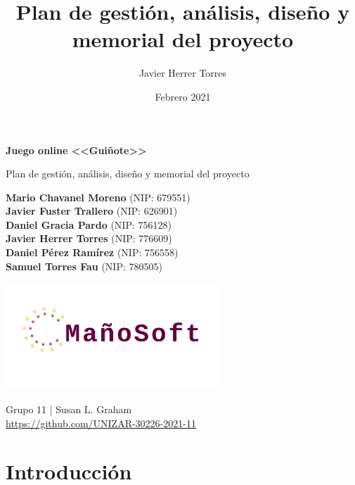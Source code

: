 \documentclass{article}
\title{Plan de gestión, análisis, diseño y memorial del proyecto}
\author{Javier Herrer Torres}
\date{Febrero 2021}
\begin{document}
\begin{titlepage}
    \begin{center}
        \vspace*{1cm}
            
        \Huge
        \textbf{Juego online <<Guiñote>>}
            
        \vspace{0.5cm}
        \LARGE
		Plan de gestión, análisis, diseño y memorial del proyecto
		
        \vspace{1.5cm}
            
        \textbf{Mario Chavanel Moreno} (NIP: 679551)\\
        \textbf{Javier Fuster Trallero} (NIP: 626901)\\
        \textbf{Daniel Gracia Pardo} (NIP: 756128)\\
        \textbf{Javier Herrer Torres} (NIP: 776609)\\
        \textbf{Daniel Pérez Ramírez} (NIP: 756558)\\
        \textbf{Samuel Torres Fau} (NIP: 780505)
        
        \vfill
            
    	\includegraphics[width=0.6\textwidth]{./images/logo.png}
            
        \vspace{1.5cm}
            
        
         Grupo 11 | Susan L. Graham\\
        \href{https://github.com/UNIZAR-30226-2021-11}{https://github.com/UNIZAR-30226-2021-11}
            
        \vspace{1.5cm}
 
    \end{center}
\end{titlepage}

\tableofcontents

\section{Introducción}
\end{document}
